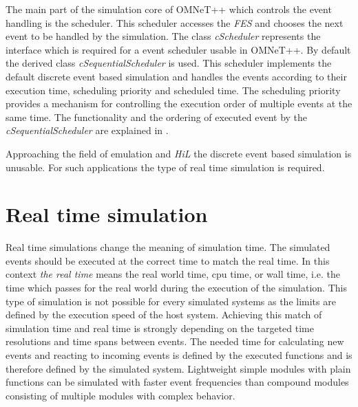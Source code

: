 The main part of the simulation core of OMNeT++ which controls the event handling is the scheduler.
This scheduler accesses the \emph{FES} and chooses the next event to be handled by the simulation.
The class \emph{cScheduler} represents the interface which is required for a event scheduler usable in OMNeT++.
By default the derived class \emph{cSequentialScheduler} is used.
This scheduler implements the default discrete event based simulation and handles the events according to their execution time, scheduling priority and scheduled time.
The scheduling priority provides a mechanism for controlling the execution order of multiple events at the same time.
The functionality and the ordering of executed event by the \emph{cSequentialScheduler} are explained in \cite[section 4.1]{OMNETMANUAL}.

Approaching the field of emulation and \emph{HiL} the discrete event based simulation is unusable.
For such applications the type of real time simulation is required.

\section{Real time simulation}
\label{sec:RealTimeSimulation}
Real time simulations change the meaning of simulation time.
The simulated events should be executed at the correct time to match the real time.
In this context \emph{the real time} means the real world time, cpu time, or wall time, i.e. the time which passes for the real world during the execution of the simulation.
This type of simulation is not possible for every simulated systems as the limits are defined by the execution speed of the host system.
Achieving this match of simulation time and real time is strongly depending on the targeted time resolutions and time spans between events.
The needed time for calculating new events and reacting to incoming events is defined by the executed functions and is therefore defined by the simulated system.
Lightweight simple modules with plain functions can be simulated with faster event frequencies than compound modules consisting of multiple modules with complex behavior.


